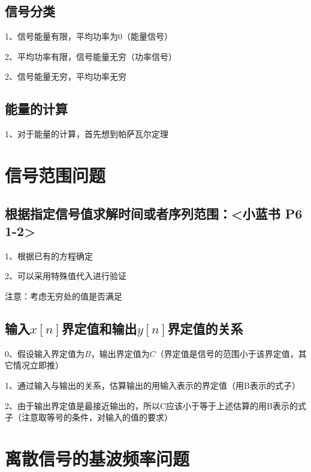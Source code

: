 \subsection{信号分类}

1、信号能量有限，平均功率为0（能量信号）

2、平均功率有限，信号能量无穷（功率信号）

2、信号能量无穷，平均功率无穷



\subsection{能量的计算}

1、对于能量的计算，首先想到帕萨瓦尔定理

\section{信号范围问题}



\subsection{根据指定信号值求解时间或者序列范围：<小蓝书 P6 1-2>}

1、根据已有的方程确定

2、可以采用特殊值代入进行验证

注意：考虑无穷处的值是否满足



\subsection{输入$x[n]$界定值和输出$y[n]$界定值的关系}

0、假设输入界定值为$B$，输出界定值为$C$（界定值是信号的范围小于该界定值，其它情况立即推）

1、通过输入与输出的关系，估算输出的用输入表示的界定值（用B表示的式子）

2、由于输出界定值是最接近输出的，所以C应该小于等于上述估算的用B表示的式子（注意取等号的条件，对输入的值的要求）

\section{离散信号的基波频率问题}

